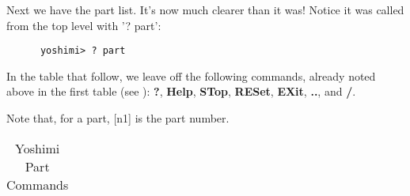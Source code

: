    Next we have the part list. It's now much clearer than it was! Notice it was
   called from the top level with '? part':

   \begin{verbatim}
      yoshimi> ? part
   \end{verbatim}

   In the table that follow, we leave off the following commands, already noted
   above in the first table
   (see ):
   \textbf{?}, \textbf{Help}, \textbf{STop}, \textbf{RESet},
   \textbf{EXit}, \textbf{..}, and \textbf{/}.

   Note that, for a part, [n1] is the part number.

   \begin{table}[H]
      \centering
      \caption{Yoshimi Part Commands}
      \label{table:yoshimi_text_part_commands}
      \begin{tabular}{l l}


\end{tabular}
\end{table}
